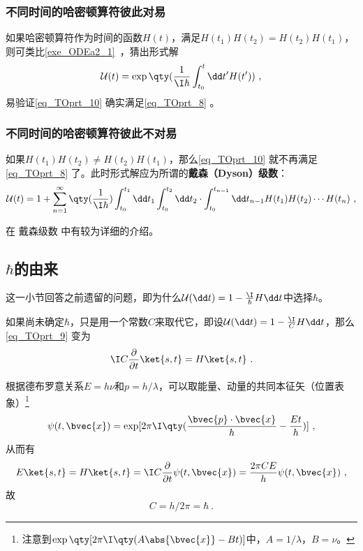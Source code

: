 \subsubsection{不同时间的哈密顿算符彼此对易}

如果哈密顿算符作为时间的函数$H(t)$，满足$H(t_1)H(t_2)=H(t_2)H(t_1)$，则可类比\autoref{exe_ODEa2_1}~，猜出形式解
\begin{equation}\label{eq_TOprt_10}
\mathcal{U}(t)=\exp\qty(\frac{1}{\I\hbar}\int^t_{t_0}\dd t' H(t'))~,
\end{equation}
易验证\autoref{eq_TOprt_10} 确实满足\autoref{eq_TOprt_8} 。



\subsubsection{不同时间的哈密顿算符彼此不对易}

如果$H(t_1)H(t_2)\not=H(t_2)H(t_1)$，那么\autoref{eq_TOprt_10} 就不再满足\autoref{eq_TOprt_8} 了。此时形式解应为所谓的\textbf{戴森（Dyson）级数}：
\begin{equation}
\mathcal{U}(t) = 1+\sum_{n=1}^\infty \qty(\frac{1}{\I \hbar})\int^{t_1}_{t_0}\dd t_1\int^{t_2}_{t_0}\dd t_2\cdot \int^{t_{n-1}}_{t_0}\dd t_{n-1}H(t_1)H(t_2)\cdots H(t_n)~,
\end{equation}

在 戴森级数 中有较为详细的介绍。


\subsection{$\hbar$的由来}\label{sub_TOprt_1}

这一小节回答之前遗留的问题，即为什么$\mathcal{U}(\dd t) = 1-\frac{\I}{\hbar} H \dd t$中选择$\hbar$。

如果尚未确定$\hbar$，只是用一个常数$C$来取代它，即设$\mathcal{U}(\dd t) = 1-\frac{\I}{C} H \dd t$，那么\autoref{eq_TOprt_9} 变为
\begin{equation}
\I C\frac{\partial}{\partial t}\ket{s, t}=H\ket{s, t}~.
\end{equation}

根据德布罗意关系$E=h\nu$和$p=h/\lambda$，可以取能量、动量的共同本征矢（位置表象）\footnote{注意到$\exp\qty[2\pi \I \qty(A\abs{\bvec{x}}-Bt)]$中，$A=1/\lambda$，$B=\nu$。}
\begin{equation}
\psi(t, \bvec{x})=\exp[2\pi\I\qty(\frac{\bvec{p}\cdot\bvec{x}}{h}-\frac{Et}{h})]~,
\end{equation}
从而有
\begin{equation}
E\ket{s, t}=H\ket{s, t}=\I C\frac{\partial}{\partial t}\psi(t, \bvec{x}) = \frac{2\pi C E}{h} \psi(t, \bvec{x})~,
\end{equation}
故
\begin{equation}
C=h/2\pi=\hbar~.
\end{equation}








